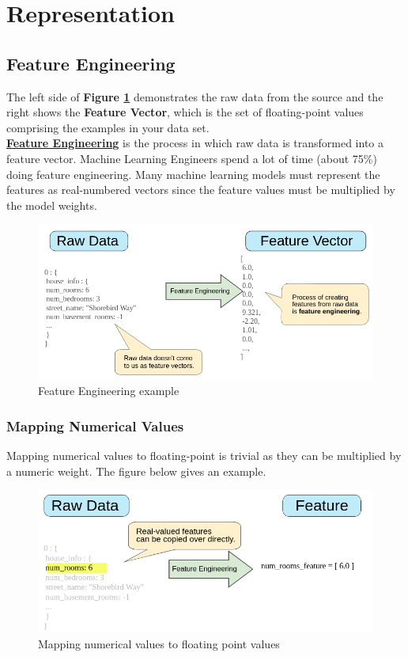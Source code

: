 \documentclass[12pt]{article}
\begin{document}
\section{Representation}
\subsection{Feature Engineering}
The left side of \textbf{Figure \ref{fig: raw to feature}} demonstrates the raw data from the source and the right shows the \textbf{Feature Vector}, which is the set of floating-point values comprising the examples in your data set.
\\\href{https://developers.google.com/machine-learning/glossary#feature_engineering}{\textbf{Feature Engineering}} is the process in which raw data is transformed into a feature vector. Machine Learning Engineers spend a lot of time (about 75\%) doing feature engineering. Many machine learning models must represent the features as real-numbered vectors since the feature values must be multiplied by the model weights.
\begin{figure}[h]
	\includegraphics[scale = 0.575]{imgs/RawToFeature.png}
	\centering
	\caption{Feature Engineering example}
	\label{fig: raw to feature}
\end{figure}

\subsubsection{Mapping Numerical Values}
Mapping numerical values to floating-point is trivial as they can be multiplied by a numeric weight. The figure below gives an example.
\begin{figure}[h]
	\includegraphics[scale = 0.55]{imgs/RawToIntFeature.png}
	\centering
	\caption{Mapping numerical values to floating point values}
\end{figure}
\end{document}
